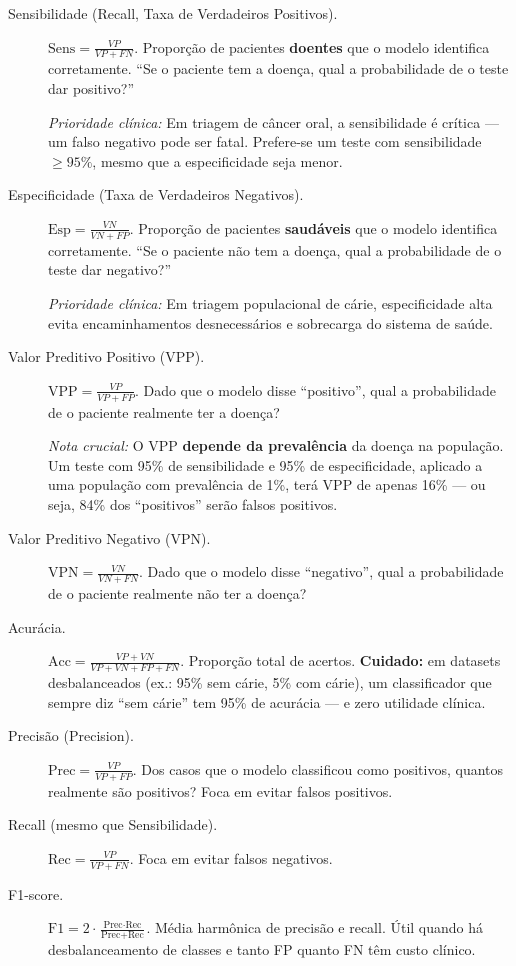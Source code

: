 \begin{description}
    \item[Sensibilidade (Recall, Taxa de Verdadeiros Positivos).] $\text{Sens} = \frac{VP}{VP + FN}$. Proporção de pacientes \textbf{doentes} que o modelo identifica corretamente. ``Se o paciente tem a doença, qual a probabilidade de o teste dar positivo?''
    
    \textit{Prioridade clínica:} Em triagem de câncer oral, a sensibilidade é crítica — um falso negativo pode ser fatal. Prefere-se um teste com sensibilidade $\geq 95\%$, mesmo que a especificidade seja menor.
    
    \item[Especificidade (Taxa de Verdadeiros Negativos).] $\text{Esp} = \frac{VN}{VN + FP}$. Proporção de pacientes \textbf{saudáveis} que o modelo identifica corretamente. ``Se o paciente não tem a doença, qual a probabilidade de o teste dar negativo?''
    
    \textit{Prioridade clínica:} Em triagem populacional de cárie, especificidade alta evita encaminhamentos desnecessários e sobrecarga do sistema de saúde.
    
    \item[Valor Preditivo Positivo (VPP).] $\text{VPP} = \frac{VP}{VP + FP}$. Dado que o modelo disse ``positivo'', qual a probabilidade de o paciente realmente ter a doença?
    
    \textit{Nota crucial:} O VPP \textbf{depende da prevalência} da doença na população. Um teste com 95\% de sensibilidade e 95\% de especificidade, aplicado a uma população com prevalência de 1\%, terá VPP de apenas 16\% — ou seja, 84\% dos ``positivos'' serão falsos positivos.
    
    \item[Valor Preditivo Negativo (VPN).] $\text{VPN} = \frac{VN}{VN + FN}$. Dado que o modelo disse ``negativo'', qual a probabilidade de o paciente realmente não ter a doença?
    
    \item[Acurácia.] $\text{Acc} = \frac{VP + VN}{VP + VN + FP + FN}$. Proporção total de acertos. \textbf{Cuidado:} em datasets desbalanceados (ex.: 95\% sem cárie, 5\% com cárie), um classificador que sempre diz ``sem cárie'' tem 95\% de acurácia — e zero utilidade clínica.
    
    \item[Precisão (Precision).] $\text{Prec} = \frac{VP}{VP + FP}$. Dos casos que o modelo classificou como positivos, quantos realmente são positivos? Foca em evitar falsos positivos.
    
    \item[Recall (mesmo que Sensibilidade).] $\text{Rec} = \frac{VP}{VP + FN}$. Foca em evitar falsos negativos.
    
    \item[F1-score.] $\text{F1} = 2 \cdot \frac{\text{Prec} \cdot \text{Rec}}{\text{Prec} + \text{Rec}}$. Média harmônica de precisão e recall. Útil quando há desbalanceamento de classes e tanto FP quanto FN têm custo clínico.
\end{description}

